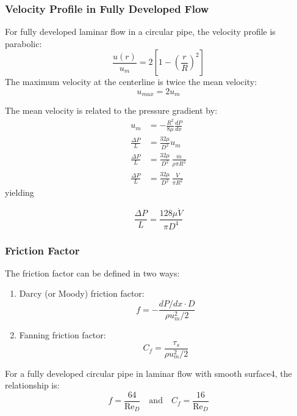 \subsubsection*{Velocity Profile in Fully Developed Flow}
For fully developed laminar flow in a circular pipe, the velocity profile is parabolic:
\[
    \frac{u(r)}{u_m} = 2\left[1-\left(\frac{r}{R}\right)^2\right]
\]
%
The maximum velocity at the centerline is twice the mean velocity:
\[
    u_{max} = 2u_m
\]

The mean velocity is related to the pressure gradient by:
\[
    \begin{aligned}
        u_m &= -\frac{R^2}{8\mu}\frac{dP}{dx}
        \\[0.5em]
        \frac{\Delta P}{L} &= \frac{32 \mu}{D^2} u_m
        \\[0.5em]
        \frac{\Delta P}{L} &=\frac{32 \mu}{D^2} \,\frac{\dot{m}}{\rho \pi R^2}
        \\[0.5em]
        \frac{\Delta P}{L} &=\frac{32 \mu}{D^2} \,\frac{\dot{V}}{\pi R^2}
    \end{aligned}
\]
yielding
\begin{definition}
    \[
        \frac{\Delta P}{L} =\frac{128 \mu \dot{V}}{\pi D^4} 
    \]
\end{definition}
%

\subsubsection*{Friction Factor}
The friction factor can be defined in two ways:
%
\begin{enumerate}
    \item Darcy (or Moody) friction factor:
    \[
    f = -\frac{dP/dx \cdot D}{\rho u_m^2/2}
    \]
    \item Fanning friction factor:
    \[
        C_f = \frac{\tau_s}{\rho u_m^2/2}
    \]
\end{enumerate}

For a fully developed circular pipe in laminar flow with smooth surface4, the relationship is:
\[
f = \frac{64}{\text{Re}_D} \quad \text{and} \quad C_f = \frac{16}{\text{Re}_D}
\]


